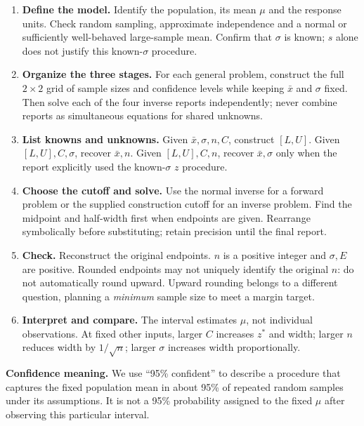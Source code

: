 \begin{enumerate}
\item \textbf{Define the model.} Identify the population, its mean $\mu$ and the response units. Check random sampling, approximate independence and a normal or sufficiently well-behaved large-sample mean. Confirm that $\sigma$ is known; $s$ alone does not justify this known-$\sigma$ procedure.
\item \textbf{Organize the three stages.} For each general problem, construct the full $2\times2$ grid of sample sizes and confidence levels while keeping $\bar x$ and $\sigma$ fixed. Then solve each of the four inverse reports independently; never combine reports as simultaneous equations for shared unknowns.
\item \textbf{List knowns and unknowns.} Given $\bar x,\sigma,n,C$, construct $[L,U]$. Given $[L,U],C,\sigma$, recover $\bar x,n$. Given $[L,U],C,n$, recover $\bar x,\sigma$ only when the report explicitly used the known-$\sigma$ $z$ procedure.
\item \textbf{Choose the cutoff and solve.} Use the normal inverse for a forward problem or the supplied construction cutoff for an inverse problem. Find the midpoint and half-width first when endpoints are given. Rearrange symbolically before substituting; retain precision until the final report.
\item \textbf{Check.} Reconstruct the original endpoints. $n$ is a positive integer and $\sigma,E$ are positive. Rounded endpoints may not uniquely identify the original $n$: do not automatically round upward. Upward rounding belongs to a different question, planning a \emph{minimum} sample size to meet a margin target.
\item \textbf{Interpret and compare.} The interval estimates $\mu$, not individual observations. At fixed other inputs, larger $C$ increases $z^*$ and width; larger $n$ reduces width by $1/\sqrt n$; larger $\sigma$ increases width proportionally.
\end{enumerate}
\textbf{Confidence meaning.} We use ``95\% confident'' to describe a procedure that captures the fixed population mean in about 95\% of repeated random samples under its assumptions. It is not a 95\% probability assigned to the fixed $\mu$ after observing this particular interval.

\clearpage
